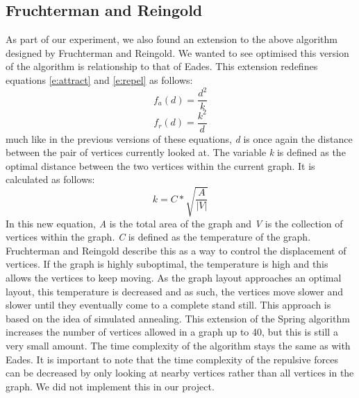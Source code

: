 \documentclass[a4paper,12pt]{article}
\begin{document}
\subsection{Fruchterman and Reingold}
As part of our experiment, we also found an extension to the above algorithm designed by Fruchterman and Reingold\cite{FandR}. We wanted to see optimised this version of the algorithm is relationship to that of Eades. This extension redefines equations \ref{e:attract} and \ref{e:repel} as follows:
\begin{equation}\label{e:FRattract}
f_a(d)=\frac{d^2}{k}
\end{equation}
\begin{equation}\label{e:FRrepel}
f_r(d)=\frac{k^2}{d}
\end{equation}
much like in the previous versions of these equations, \emph{d} is once again the distance between the pair of vertices currently looked at. The variable \emph{k} is defined as the optimal distance between the two vertices within the current graph. It is calculated as follows:
\begin{equation}\label{e:optimalD}
k=C*\sqrt{\frac{A}{|V|}}
\end{equation}
In this new equation, \emph{A} is the total area of the graph and \emph{V} is the collection of vertices within the graph. \emph{C} is defined as the temperature of the graph. Fruchterman and Reingold describe this as a way to control the displacement of vertices. If the graph is highly suboptimal, the temperature is high and this allows the vertices to keep moving. As the graph layout approaches an optimal layout, this temperature is decreased and as such, the vertices move slower and slower until they eventually come to a complete stand still. This approach is based on the idea of simulated annealing.
\newline
This extension of the Spring algorithm increases the number of vertices allowed in a graph up to 40, but this is still a very small amount. The time complexity of the algorithm stays the same as with Eades. It is important to note that the time complexity of the repulsive forces can be decreased by only looking at nearby vertices rather than all vertices in the graph. We did not implement this in our project.
\end{document}
